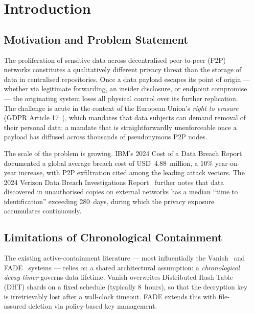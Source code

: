 \documentclass[review,12pt]{elsarticle}
\begin{document}
\section{Introduction}
\label{sec:intro}

\subsection{Motivation and Problem Statement}

The proliferation of sensitive data across decentralised peer-to-peer (P2P)
networks constitutes a qualitatively different privacy threat than the storage
of data in centralised repositories. Once a data payload escapes its point of
origin --- whether via legitimate forwarding, an insider disclosure, or
endpoint compromise --- the originating system loses all physical control over
its further replication. The challenge is acute in the context of the European
Union's \emph{right to erasure} (GDPR Article 17~\cite{gdpr2016}), which mandates
that data subjects can demand removal of their personal data; a mandate that is
straightforwardly unenforceable once a payload has diffused across thousands
of pseudonymous P2P nodes.

The scale of the problem is growing. IBM's 2024 Cost of a Data Breach
Report~\cite{ibm2024breach} documented a global average breach cost of
USD~4.88~million, a 10\% year-on-year increase, with P2P exfiltration cited
among the leading attack vectors. The 2024 Verizon Data Breach Investigations
Report~\cite{verizon2024dbir} further notes that data discovered in unauthorised
copies on external networks has a median ``time to identification'' exceeding
280~days, during which the privacy exposure accumulates continuously.

\subsection{Limitations of Chronological Containment}

The existing active-containment literature --- most influentially the
Vanish~\cite{geambasu2009vanish} and FADE~\cite{tang2010fade} systems --- relies
on a shared architectural assumption: a \emph{chronological decay timer} governs
data lifetime. Vanish overwrites Distributed Hash Table (DHT) shards on a fixed
schedule (typically 8~hours), so that the decryption key is irretrievably lost
after a wall-clock timeout. FADE extends this with file-assured deletion via
policy-based key management.
\end{document}
